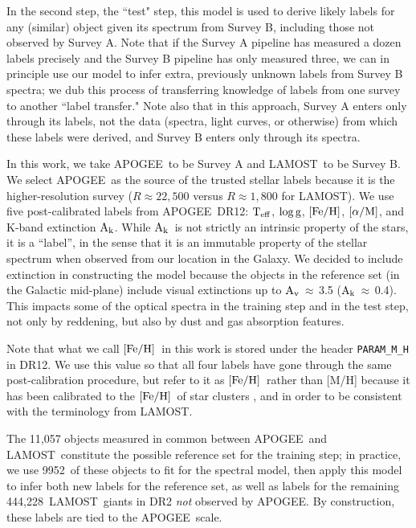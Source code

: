 \documentclass[12pt, letterpaper, preprint]{aastex}
\newcommand{\apogee}{APOGEE}
\newcommand{\lamost}{LAMOST}
\newcommand{\teff}{\mbox{$\rm T_{eff}$}}
\newcommand{\feh}{\mbox{$\rm [Fe/H]$}}
\newcommand{\alpham}{\mbox{$\rm [\alpha/M]$}}
\newcommand{\logg}{\mbox{$\rm \log g$}}
\newcommand{\ak}{\mbox{$\rm A_k$}}
\newcommand{\av}{\mbox{$\rm A_v$}}
\newcommand{\ntrobj}{9952}
\newcommand{\ntestobj}{444,228}
\begin{document}
In the second step, the ``test" step, this model is used to derive 
likely labels for any (similar) object given its spectrum from Survey B,
including those not observed by Survey A. 
Note that if the Survey A pipeline has measured a dozen labels precisely and the 
Survey B pipeline has only measured three, we can in principle use
our model to infer extra, previously unknown labels from Survey B spectra; we dub this process of transferring knowledge of labels from one survey to another ``label transfer." 
Note also that in this approach, Survey A enters only through its labels, not the data (spectra, light curves, or otherwise) from which these labels were derived, and Survey B enters only through its spectra. 

In this work, we take \apogee\ to be Survey A and \lamost\ to be Survey B. 
We select \apogee\ as the source of the trusted stellar
labels because it is the higher-resolution survey ($R\approx22,500$ versus $R\approx1,800$ for \lamost).
We use five post-calibrated labels from \apogee\ DR12: \teff, \logg, \feh, \alpham, and K-band extinction \ak. While \ak\ is not strictly an intrinsic property of the stars, it is a ``label'',
in the sense that it is an immutable property of the stellar spectrum when observed from our location in the Galaxy.
We decided to include extinction in constructing the model because 
the objects in the reference set (in the Galactic mid-plane) 
include visual extinctions up to \av\,$\approx$\,3.5 (\ak\,$\approx$\,0.4).
This impacts some of the optical spectra in the training step and in the test step,
not only by reddening, but also by dust and gas absorption features. 

Note that what we call \feh\ in this work is stored under the header \texttt{PARAM\_M\_H} in DR12. 
We use this value so that all four labels have gone through the same post-calibration procedure, but refer to it as \feh\ rather than [M/H] because it has been calibrated to the \feh\ of star clusters \citep{Meszaros2013}, and in order to be consistent with the terminology
from \lamost.

The 11,057 objects measured in common between \apogee\ and \lamost\ constitute the possible reference set for the training step;
in practice, we use \ntrobj\ of these objects to fit for 
the spectral model, then apply this model 
to infer both new labels for the reference set,
as well as labels for the remaining 
\ntestobj\ \lamost\ giants in DR2 \emph{not} observed by \apogee.
By construction, these labels are tied to the \apogee\ scale.
\end{document}
